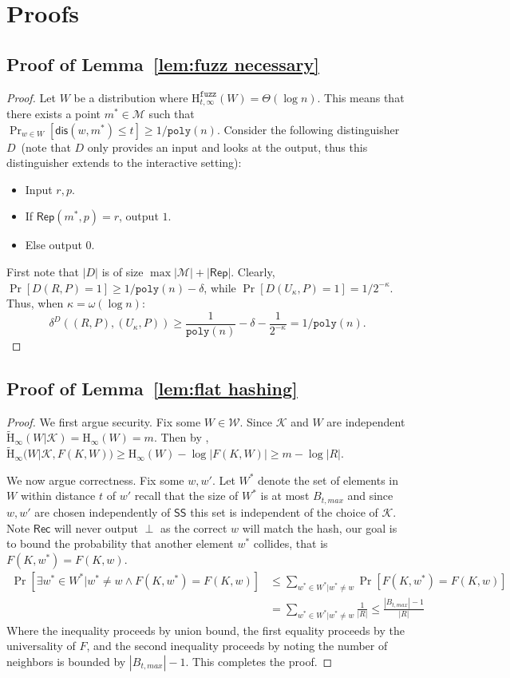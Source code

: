 \documentclass[11pt]{article}
\newcommand{\lemref}[1]{\mbox{Lemma~\ref{#1}}}
\newcommand{\class}[1]{{\ensuremath{\mathsf{#1}}}}
\newcommand{\rep}{\ensuremath{\class{Rep}}\xspace}
\newcommand{\sketch}{\ensuremath{\class{SS}}\xspace}
\newcommand{\rec}{\ensuremath{\class{Rec}}\xspace}
\newcommand{\dis}{\ensuremath{\mathsf{dis}}}
\newcommand{\poly}{\ensuremath{\mathtt{poly}}\xspace}
\newcommand{\Hoo}{\mathrm{H}_\infty}
\newcommand{\Hav}{\tilde{\mathrm{H}}_\infty}
\newcommand{\Hfuzz}{\mathrm{H}^{\mathtt{fuzz}}_{t,\infty}}
\begin{document}
\section{Proofs}
\subsection{Proof of \lemref{lem:fuzz necessary}}
\label{sec:proof fuzz necessary}
\begin{proof}
Let $W$ be a distribution where $\Hfuzz(W) = \Theta(\log n)$.  This means that there exists a point $m^*\in \mathcal{M}$ such that $\Pr_{w\in W}[\dis (w, m^*)\leq t] \geq 1/\poly(n)$.  Consider the following distinguisher $D$~(note that $D$ only provides an input and looks at the output, thus this distinguisher extends to the interactive setting):
\begin{itemize}
\item Input $r, p$.
\item If $\rep(m^*, p) = r$, output $1$.
\item Else output $0$.
\end{itemize}
First note that $|D|$ is of size $\max |\mathcal{M}|+ |\rep|$.  Clearly, $\Pr[D(R, P) = 1]\geq 1/\poly(n) - \delta$, while $\Pr[D(U_\kappa, P)=1 ]= 1/2^{-\kappa}$.  Thus, when $\kappa = \omega(\log n)$:
\[
\delta^D((R, P), (U_\kappa, P))\geq \frac{1}{\poly(n)} -\delta -  \frac{1}{2^{-\kappa}} = 1/\poly(n).
\]
\end{proof}

\subsection{Proof of \lemref{lem:flat hashing}}
\label{sec:proof of flat hashing}
\begin{proof}
We first argue security.  Fix some $W\in\mathcal{W}$. Since $\mathcal{K}$ and $W$ are independent $\Hav(W | \mathcal{K}) = \Hoo(W) = m$.  Then by \cite[Lemma 2.2b]{DBLP:journals/siamcomp/DodisORS08}, $\Hav(W | \mathcal{K}, F(K, W)) \ge \Hoo(W) - \log |F(K, W)| \ge m - \log |R|$.

We now argue correctness.  Fix some $w, w'$.  Let $W^*$ denote the set of elements in $W$ within distance $t$ of $w'$ recall that the size of $W^*$ is at most $B_{t, max}$ and since $w, w'$ are chosen independently of $\sketch$ this set is independent of the choice of $\mathcal{K}$.  Note $\rec$ will never output $\perp$ as the correct $w$ will match the hash, our goal is to bound the probability that another element $w^*$ collides, that is $F(K, w^*) = F(K, w)$.
\begin{align*}
\Pr[\exists w^* \in W^* |w^* \neq w \wedge F(K, w^*) = F(K, w)] &\le \sum_{w^*\in W^* | w^*\neq w} \Pr[F(K, w^*) = F(K, w)] \\
 &= \sum_{w^*\in W^* | w^*\neq w} \frac{1}{|R|} \le \frac{|B_{t, max}|-1}{|R|}
\end{align*}
Where the inequality proceeds by union bound, the first equality proceeds by the universality of $F$, and the second inequality proceeds by noting the number of neighbors is bounded by $|B_{t, max}|-1$.  This completes the proof.
\end{proof}
\end{document}
